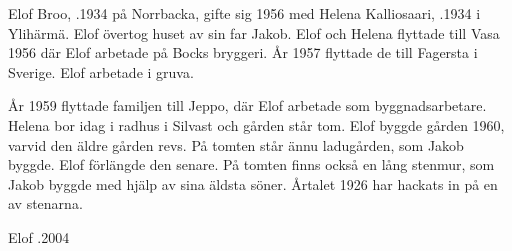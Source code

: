 Elof Broo, .1934 på Norrbacka, gifte sig 1956 med Helena Kalliosaari, .1934 i Ylihärmä. Elof övertog huset av sin far Jakob. Elof och Helena flyttade till Vasa 1956 där Elof arbetade på Bocks bryggeri. År 1957 flyttade de till Fagersta i Sverige. Elof arbetade i gruva.
\begin{jhchildren}
  \item {}
  \item {}
  \item {}
  \item {}
\end{jhchildren}

År 1959 flyttade familjen till Jeppo, där Elof arbetade som byggnadsarbetare. Helena bor idag i radhus i Silvast och gården står tom. Elof byggde gården 1960, varvid den äldre gården revs. På tomten står ännu ladugården, som Jakob byggde. Elof förlängde den senare. På tomten finns också en lång stenmur, som Jakob byggde med hjälp av sina äldsta söner. Årtalet 1926 har hackats in på en av stenarna.

Elof .2004





